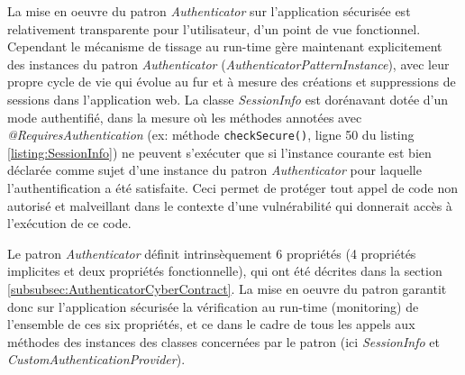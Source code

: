 La mise en oeuvre du patron \textit{Authenticator} sur l'application sécurisée est relativement transparente pour l'utilisateur, d'un point de vue fonctionnel. Cependant le mécanisme de tissage au run-time gère maintenant explicitement des instances du patron  \textit{Authenticator} (\textit{AuthenticatorPatternInstance}), avec leur propre cycle de vie qui évolue au fur et à mesure des créations et suppressions de sessions dans l'application web. La classe \textit{SessionInfo} est dorénavant dotée d'un mode authentifié, dans la mesure où les méthodes annotées avec \textit{@RequiresAuthentication} (ex: méthode \texttt{checkSecure()}, ligne 50 du listing \ref{listing:SessionInfo}) ne peuvent s'exécuter que si l'instance courante est bien déclarée comme sujet d'une instance du patron \textit{Authenticator} pour laquelle l'authentification a été satisfaite. Ceci permet de protéger tout appel de code non autorisé et malveillant dans le contexte d'une vulnérabilité qui donnerait accès à l'exécution de ce code.

Le patron \textit{Authenticator} définit intrinsèquement 6 propriétés (4 propriétés implicites et deux propriétés fonctionnelle), qui ont été décrites dans la section \ref{subsubsec:AuthenticatorCyberContract}. La mise en oeuvre du patron garantit donc sur l'application sécurisée la vérification au run-time (monitoring) de l'ensemble de ces six propriétés, et ce dans le cadre de tous les appels aux méthodes des instances des classes concernées par le patron (ici \textit{SessionInfo} et \textit{CustomAuthenticationProvider}). 


